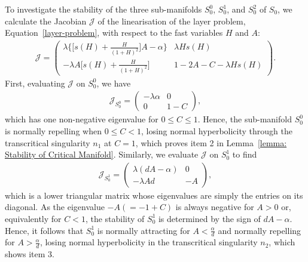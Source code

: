 \documentclass{article}
\theoremstyle{definition}
\numberwithin{equation}{section}
\begin{document}
To investigate the stability of the three sub-manifolds $S_0^0$, $S_0^1$, and $S_0^2$ of $S_0$, we calculate the Jacobian $\mathcal{J}$ of the linearisation of the layer problem, Equation~\eqref{layer-problem}, with respect to the fast variables $H$ and $A$: 
\begin{align*}
    \mathcal{J} = \begin{pmatrix}
        \lambda\Big\{\Big[s(H)+\frac{H}{(1+H)^2}\Big]A-\alpha\Big\} &\lambda H s(H) \\
        -\lambda A\Big[s(H)+\frac{H}{(1+H)^2}\Big] & 1-2A-C-\lambda Hs(H)
    \end{pmatrix}.
\end{align*}
First, evaluating $\mathcal{J}$ on $S_0^0$, we have
\begin{align*}
    \mathcal{J}_{S_0^0} = \begin{pmatrix}
        -\lambda\alpha & 0 \\
        0 & 1-C
    \end{pmatrix},
\end{align*}
which has one non-negative eigenvalue for $0\leq C\leq 1$. Hence, the sub-manifold $S_0^0$ is normally repelling when $0\leq C<1$, losing normal hyperbolicity through the transcritical singularity $n_1$ at $C=1$, which proves item 2 in Lemma~\ref{lemma: Stability of Critical Manifold}.
Similarly, we evaluate $\mathcal{J}$ on $S_0^1$ to find
\begin{align*}
    \mathcal{J}_{S_0^1} = \begin{pmatrix}
        \lambda(dA-\alpha) &0 \\
        -\lambda A d & -A
    \end{pmatrix},
\end{align*}
which is a lower triangular matrix whose eigenvalues are simply the entries on its diagonal. As the eigenvalue $-A(=-1+C)$ is always negative for $A>0$ or, equivalently for $C<1$, the stability of $S_0^1$ is determined by the sign of $dA-\alpha$. Hence, it follows that $S_0^1$ is normally attracting for $A<\frac{\alpha}{d}$ and normally repelling for $A>\frac{\alpha}{d}$, losing normal hyperbolicity in the transcritical singularity $n_2$, which shows item 3.  
\end{document}
